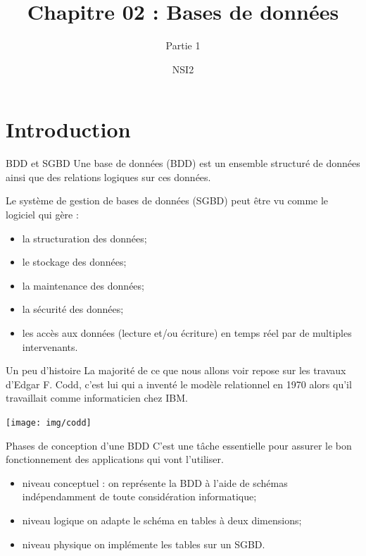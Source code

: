 \documentclass[10pt]{beamer}
\title{Chapitre 02 : Bases de données}
\subtitle{Partie 1}
\author{NSI2}
\begin{document}
	\maketitle
    \section{Introduction}
\begin{frame}{BDD et SGBD}
	Une \alert{base de données} (BDD) est un ensemble structuré de données ainsi que des relations logiques sur ces données.\\\pause

    Le \alert{système de gestion de bases de données} (SGBD) peut être vu comme le logiciel qui gère :\pause
    \begin{itemize}
    	\item	la structuration des données;\pause
    	\item	le stockage des données;\pause
        \item 	la maintenance des données;\pause
        \item 	la sécurité des données;\pause
        \item 	les accès aux données (lecture et/ou écriture) en temps réel par de multiples intervenants.
    \end{itemize}
\end{frame}

\begin{frame}{Un peu d'histoire}
	La majorité de ce que nous allons voir repose sur les travaux d'Edgar F. Codd, c'est lui qui a inventé le modèle relationnel en 1970 alors qu'il travaillait comme informaticien chez IBM.
    \begin{center}
        \texttt{[image: img/codd]}
    \end{center}
\end{frame}

\begin{frame}{Phases de conception d'une BDD}
	C'est une tâche essentielle pour assurer le bon fonctionnement des applications qui vont l'utiliser.\pause
    \begin{itemize}
    	\item	\alert{niveau conceptuel} : on représente la BDD à l'aide de schémas indépendamment de toute considération informatique;\pause
    	\item	\alert{niveau logique} on adapte le schéma en tables à deux dimensions;\pause
        \item	\alert{niveau physique} on implémente les tables sur un SGBD.
    \end{itemize}
\end{frame}
\end{document}
